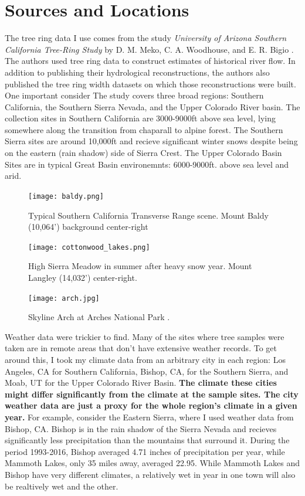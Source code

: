 \documentclass[]{article}
\begin{document}
\section{Sources and Locations}
The tree ring data I use comes from the study \textit{University of Arizona Southern California Tree-Ring Study} by D. M. Meko, C. A. Woodhouse, and E. R. Bigio \cite{tree_study}. The authors used tree ring data to construct estimates of historical river flow. In addition to publishing their hydrological reconstructions, the authors also published the tree ring width datasets on which those reconstructions were built.
One important consider
The study covers three broad regions: Southern California, the Southern Sierra Nevada, and the Upper Colorado River basin. The collection sites in Southern California are 3000-9000ft above sea level, lying somewhere along the transition from chaparall to alpine forest. The Southern Sierra sites are around 10,000ft and recieve significant winter snows despite being on the eastern (rain shadow) side of Sierra Crest. The Upper Colorado Basin Sites are in typical Great Basin environemnts: 6000-9000ft. above sea level and arid. 

\begin{figure}
	\centering
	\texttt{[image: baldy.png]}
	\caption{Typical Southern California Transverse Range scene. Mount Baldy (10,064') background center-right}
	\label{fig:baldy}
\end{figure}

\begin{figure}
	\centering
	\texttt{[image: cottonwood\_lakes.png]}
	\caption{High Sierra Meadow in summer after heavy snow year. Mount Langley (14,032') center-right.}
	\label{fig:cottonwood}
\end{figure}

\begin{figure}
	\centering
	\texttt{[image: arch.jpg]}
	\caption{Skyline Arch at Arches National Park \cite{arch_pic}.}
	\label{fig:arch}
\end{figure}

Weather data were trickier to find. Many of the sites where tree samples were taken are in remote areas that don't have extensive weather records. To get around this, I took my climate data from an arbitrary city in each region: Los Angeles, CA for Southern California, Bishop, CA, for the Southern Sierra, and Moab, UT for the Upper Colorado River Basin. \textbf{The climate these cities might differ significantly from the climate at the sample sites.  The city weather data are just a proxy for the whole region's climate in a given year.} For example, consider the Eastern Sierra, where I used weather data from Bishop, CA. Bishop is in the rain shadow of the Sierra Nevada and recieves significantly less precipitation than  the mountains that surround it. During the period 1993-2016, Bishop averaged 4.71 inches of precipitation per year,  while Mammoth Lakes, only 35 miles away, averaged 22.95. While Mammoth Lakes and Bishop have very different climates, a relatively wet in year in one town will also be realtively wet and the other. 
\end{document}
